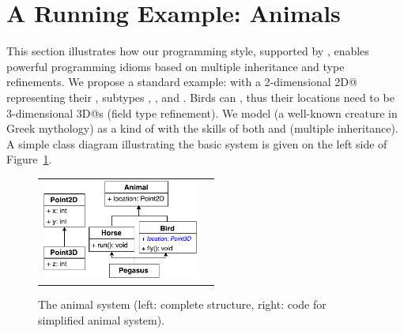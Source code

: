 \section{A Running Example: Animals}\label{sec:ep}
This section illustrates how our programming style, supported by
\mixinAnn{}, enables powerful programming idioms based on multiple
inheritance and type refinements.  We propose a standard example:
\Q@Animal@s with a 2-dimensional \Q@Point2D@ representing their
\Q@location@, subtypes \Q@Horses@, \Q@Bird@s, and \Q@Pegasus@.
Birds can \Q@fly@, thus their locations need to be 3-dimensional
\Q@Point3D@s (field type refinement). We model \Q@Pegasus@
(a well-known creature in Greek mythology) as a kind of
\Q@Animal@ with the skills of both \Q@Horse@s and \Q@Bird@s (multiple
inheritance). A simple class diagram illustrating the basic system is
given on the left side of Figure~\ref{fig:pegasus}.


\begin{figure}[h]
\centering
\vspace{-1ex}
\begin{tabular}{c|c}
\includegraphics[height=3.3cm]{pdfs/PegasusDetail.pdf}\hspace{0pt} &
\begin{minipage}{7cm}
\vspace{-95pt}
\end{minipage}
\end{tabular}
\caption{The animal system (left: complete structure, right: code for simplified animal system).}\label{fig:pegasus}
\saveSpaceFig
\end{figure}

